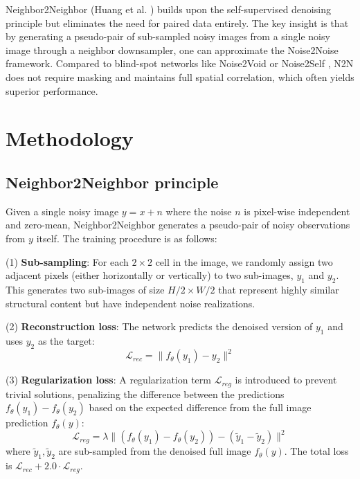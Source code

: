 \documentclass[twocolumn, a4paper, 10pt]{article}
\begin{document}
Neighbor2Neighbor (Huang et al. \cite{b1}) builds upon the self-supervised denoising principle but eliminates the need for paired data entirely. The key insight is that by generating a pseudo-pair of sub-sampled noisy images from a single noisy image through a neighbor downsampler, one can approximate the Noise2Noise framework. Compared to blind-spot networks like Noise2Void \cite{b2} or Noise2Self \cite{b3}, N2N does not require masking and maintains full spatial correlation, which often yields superior performance.

\section{Methodology}

\subsection{Neighbor2Neighbor principle}

Given a single noisy image $y = x + n$ where the noise $n$ is pixel-wise independent and zero-mean, Neighbor2Neighbor generates a pseudo-pair of noisy observations from $y$ itself. The training procedure is as follows:

(1) \textbf{Sub-sampling}: For each $2 \times 2$ cell in the image, we randomly assign two adjacent pixels (either horizontally or vertically) to two sub-images, $y_1$ and $y_2$. This generates two sub-images of size $H/2 \times W/2$ that represent highly similar structural content but have independent noise realizations.

(2) \textbf{Reconstruction loss}: The network predicts the denoised version of $y_1$ and uses $y_2$ as the target:
\begin{equation}
    \mathcal{L}_{rec} = \|f_\theta(y_1) - y_2\|^2
\end{equation}

(3) \textbf{Regularization loss}: A regularization term $\mathcal{L}_{reg}$ is introduced to prevent trivial solutions, penalizing the difference between the predictions $f_\theta(y_1) - f_\theta(y_2)$ based on the expected difference from the full image prediction $f_\theta(y)$:
\begin{equation}
    \mathcal{L}_{reg} = \lambda \|(f_\theta(y_1) - f_\theta(y_2)) - (\tilde{y}_1 - \tilde{y}_2)\|^2
\end{equation}
where $\tilde{y}_1, \tilde{y}_2$ are sub-sampled from the denoised full image $f_\theta(y)$. The total loss is $\mathcal{L}_{rec} + 2.0 \cdot \mathcal{L}_{reg}$.
\end{document}
